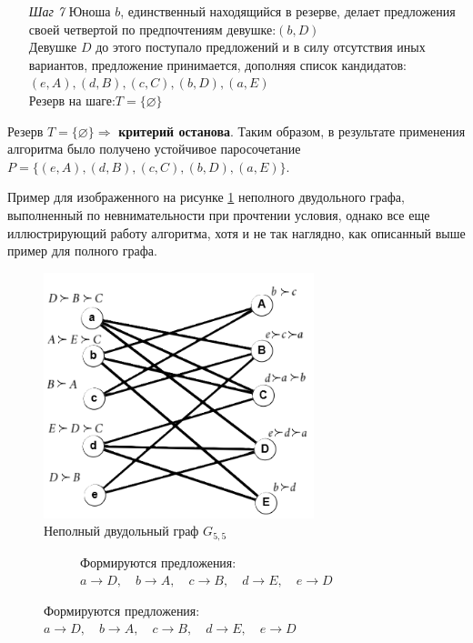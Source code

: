 \documentclass{article}
\begin{document}
\begin{enumerate}
\begin{enumerate}
    \item[\textit{Шаг 7}] Юноша $b$, единственный находящийся в резерве, делает предложения своей четвертой по предпочтениям девушке:\qquad $(b,D)$\\
    Девушке $D$ до этого поступало предложений и в силу отсутствия иных вариантов, предложение принимается, дополняя список кандидатов:\qquad $(e,A),(d,B),(c,C),(b,D),(a,E)$\\
    Резерв на шаге:\qquad $T =\{\varnothing\}$   
\end{enumerate}
Резерв $T =\{\varnothing\} \Longrightarrow$ \textbf{критерий останова}. Таким образом, в результате применения алгоритма было получено устойчивое паросочетание $P = \{(e,A),(d,B),(c,C),(b,D),(a,E)\}$.
\clearpage
\begin{center}
Пример для изображенного на рисунке \ref{fig:to_bin_11_graph} неполного двудольного графа, выполненный по невнимательности при прочтении условия, однако все еще иллюстрирующий работу алгоритма, хотя и не так наглядно, как описанный выше пример для полного графа.
\end{center}
\begin{figure}[ht]
    \includegraphics[width=0.7\textwidth, center]{attachments/11/00.png}
    \caption{Неполный двудольный граф $G_{5,5}$}
    \label{fig:to_bin_11_graph}
\end{figure}
\begin{figure}
     \centering
     \begin{subfigure}[b]{0.47\textwidth}
        \centering
         \caption*{Формируются предложения:\\ $a\rightarrow D,\quad b\rightarrow A,\quad c\rightarrow B,\quad d\rightarrow E,\quad e\rightarrow D$ \\
}
\end{subfigure}
\end{figure}
\end{enumerate}
\end{document}
